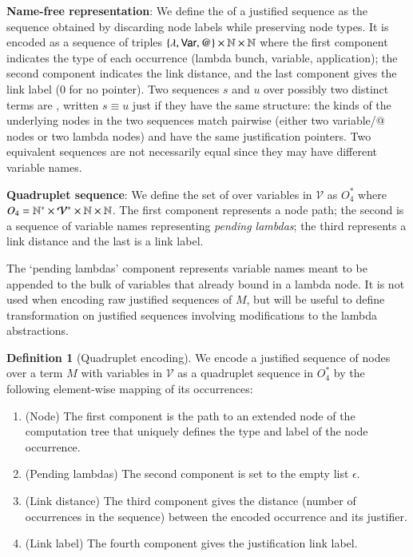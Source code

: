 \documentclass{elsarticle}
\theoremstyle{plain}
\theoremstyle{definition}
\newtheorem{definition}{Definition}[section]
\theoremstyle{remark}
\begin{document}
{\bf Name-free representation}: We define the  of a justified sequence as the sequence obtained by discarding node labels while preserving node types. It is encoded as a sequence of triples $\{\lambda, {\sf Var}, @ \}\times\mathbb{N}\times\mathbb{N}$ where the first component indicates the type of each occurrence (lambda bunch, variable, application); the second component indicates the link distance, and the last component gives the link label ($0$ for no pointer).
Two sequences $s$ and $u$ over possibly two distinct terms are , written $s \equiv u$ just if they have the same structure: the kinds of the underlying nodes in the two sequences match pairwise (either two variable/@ nodes or two lambda nodes) and have the same justification pointers. Two equivalent sequences are not necessarily equal since they may have different variable names.

{\bf Quadruplet sequence}:
We define the set of  over variables in $\mathcal{V}$ as $O_4^*$ where $O_4 = \mathbb{N}^*\times \mathcal{V}^* \times\mathbb{N}\times\mathbb{N}$. The first component represents a node path; the second is a sequence of variable names representing \emph{pending lambdas}; the third represents a link distance and the last is a link label.

The `pending lambdas' component represents variable names meant to be appended to the bulk of variables that already bound in a lambda node. It is not used when encoding raw justified sequences of $M$, but will be useful to define transformation on justified sequences involving modifications to the lambda abstractions.

\begin{definition}[Quadruplet encoding]
    \label{def:quadruplet_encoding}
    We encode a justified sequence of nodes over a term $M$
    with variables in $\mathcal{V}$ as a quadruplet sequence in $O_4^*$ by the following element-wise mapping of its occurrences:
    \begin{enumerate}[nosep]
        \item (Node) The first component is the path to an extended node of the computation tree that uniquely defines the type and label of the node occurrence.
        \item (Pending lambdas) The second component is set to the empty list $\epsilon$.
        \item (Link distance) The third component gives the distance (number of occurrences in the sequence) between the encoded occurrence and its justifier.
        \item (Link label) The fourth component gives the justification link label.
    \end{enumerate}
\end{definition}
\end{document}
